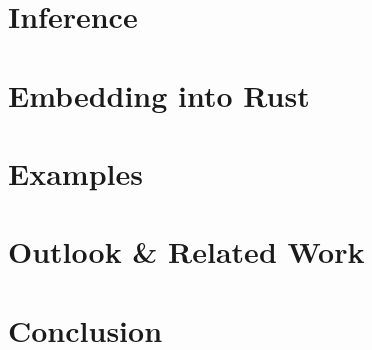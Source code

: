 \documentclass[runningheads]{llncs}
\begin{document}
\section{Inference}


\section{Embedding into Rust}


\section{Examples}


\section{Outlook \& Related Work}


\section{Conclusion}


\newpage

% 
\nocite{*}



\newpage


\end{document}
